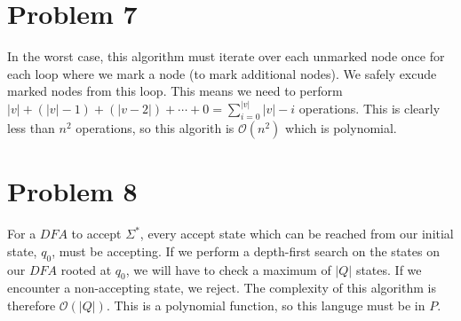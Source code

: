 \documentclass{article}
\newenvironment{problem}[1]{
  \nobreak\section*{Problem #1}
}{}
\newcommand*{\bigO}[1]{\ensuremath{\mathcal{O}\left(#1\right)}}
\begin{document}
  \begin{problem}{7}
    In the worst case, this algorithm must iterate over each unmarked node
    once for each loop where we mark a node (to mark additional nodes).  We
    safely excude marked nodes from this loop.  This means we need to perform
    $|v| + (|v|-1) + (|v-2|) + \dotsb + 0 = \sum_{i=0}^{|v|} |v|-i$ operations.
    This is clearly less than $n^2$ operations, so this algorith is $\bigO{n^2}$
    which is polynomial.
  \end{problem}

  \begin{problem}{8}
    For a $DFA$ to accept $\Sigma^*$, every accept state which can be reached
    from our initial state, $q_0$, must be accepting.  If we perform a depth-first
    search on the states on our $DFA$ rooted at $q_0$, we will have to check a
    maximum of $|Q|$ states.  If we encounter a non-accepting state, we reject.
    The complexity of this algorithm is therefore $\bigO{|Q|}$.  This is a polynomial
    function, so this languge must be in $P$.
  \end{problem}
\end{document}
